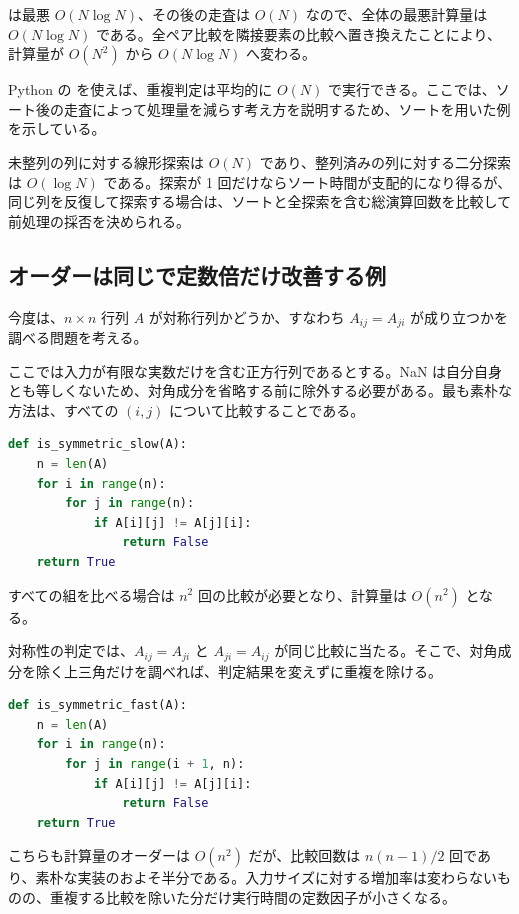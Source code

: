  は最悪 $O(N \log N)$、その後の走査は $O(N)$ なので、全体の最悪計算量は $O(N \log N)$ である。全ペア比較を隣接要素の比較へ置き換えたことにより、計算量が $O(N^2)$ から $O(N \log N)$ へ変わる。

Python の  を使えば、重複判定は平均的に $O(N)$ で実行できる。ここでは、ソート後の走査によって処理量を減らす考え方を説明するため、ソートを用いた例を示している。

未整列の列に対する線形探索は $O(N)$ であり、整列済みの列に対する二分探索は $O(\log N)$ である。探索が 1 回だけならソート時間が支配的になり得るが、同じ列を反復して探索する場合は、ソートと全探索を含む総演算回数を比較して前処理の採否を決められる。

\subsection{オーダーは同じで定数倍だけ改善する例}

今度は、$n \times n$ 行列 $A$ が対称行列かどうか、すなわち $A_{ij} = A_{ji}$ が成り立つかを調べる問題を考える。

ここでは入力が有限な実数だけを含む正方行列であるとする。NaN は自分自身とも等しくないため、対角成分を省略する前に除外する必要がある。最も素朴な方法は、すべての $(i, j)$ について比較することである。

\begin{lstlisting}[language=Python]
def is_symmetric_slow(A):
    n = len(A)
    for i in range(n):
        for j in range(n):
            if A[i][j] != A[j][i]:
                return False
    return True
\end{lstlisting}

すべての組を比べる場合は $n^2$ 回の比較が必要となり、計算量は $O(n^2)$ となる。

対称性の判定では、\(A_{ij}=A_{ji}\) と \(A_{ji}=A_{ij}\) が同じ比較に当たる。そこで、対角成分を除く上三角だけを調べれば、判定結果を変えずに重複を除ける。

\begin{lstlisting}[language=Python]
def is_symmetric_fast(A):
    n = len(A)
    for i in range(n):
        for j in range(i + 1, n):
            if A[i][j] != A[j][i]:
                return False
    return True
\end{lstlisting}

こちらも計算量のオーダーは $O(n^2)$ だが、比較回数は $n(n-1)/2$ 回であり、素朴な実装のおよそ半分である。入力サイズに対する増加率は変わらないものの、重複する比較を除いた分だけ実行時間の定数因子が小さくなる。

